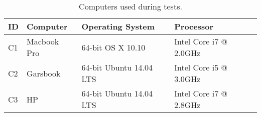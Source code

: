 \begin{table}[h]
  \begin{tabular}{llll}
  ID      & Computer                  & Operating System          & Processor                    \\ \hline
  C1      & Macbook Pro               & 64-bit OS X 10.10         & Intel Core i7 @ 2.0GHz       \\ %
  C2      & Garsbook                  & 64-bit Ubuntu 14.04 LTS   & Intel Core i5 @ 3.0GHz       \\ %
  C3      & HP                        & 64-bit Ubuntu 14.04 LTS   & Intel Core i7 @ 2.8GHz       \\ %
  \end{tabular}
  \caption{Computers used during tests.}
  \label{tbl:target_computers}
\end{table}


